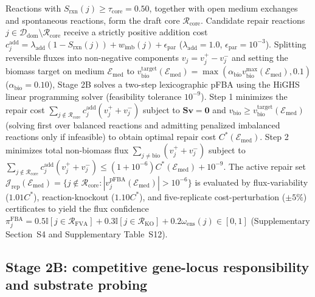 \documentclass[10pt,twocolumn]{article}
\begin{document}
Reactions with $S_{\text{rxn}}(j) \ge \tau_{\text{core}} = 0.50$, together with open medium exchanges and spontaneous reactions, form the draft core $\mathcal{R}_{\text{core}}$. Candidate repair reactions $j \in \mathcal{D}_{\text{dom}} \setminus \mathcal{R}_{\text{core}}$ receive a strictly positive addition cost $c_j^{\text{add}} = \lambda_{\text{add}}(1 - S_{\text{rxn}}(j)) + w_{\text{imb}}(j) + \epsilon_{\text{par}}$ ($\lambda_{\text{add}} = 1.0$, $\epsilon_{\text{par}} = 10^{-3}$). Splitting reversible fluxes into non-negative components $v_j = v_j^+ - v_j^-$ and setting the biomass target on medium $\mathcal{E}_{\text{med}}$ to $v_{\text{bio}}^{\text{target}}(\mathcal{E}_{\text{med}}) = \max(\alpha_{\text{bio}} v_{\text{bio}}^{\max}(\mathcal{E}_{\text{med}}), 0.1)$ ($\alpha_{\text{bio}} = 0.10$), Stage 2B solves a two-step lexicographic pFBA \citep{lewis2010omic} using the HiGHS linear programming solver (feasibility tolerance $10^{-9}$). Step 1 minimizes the repair cost $\sum_{j \notin \mathcal{R}_{\text{core}}} c_j^{\text{add}}(v_j^+ + v_j^-)$ subject to $\mathbf{S}\mathbf{v} = \mathbf{0}$ and $v_{\text{bio}} \ge v_{\text{bio}}^{\text{target}}(\mathcal{E}_{\text{med}})$ (solving first over balanced reactions and admitting penalized imbalanced reactions only if infeasible) to obtain optimal repair cost $C^*(\mathcal{E}_{\text{med}})$. Step 2 minimizes total non-biomass flux $\sum_{j \ne \text{bio}} (v_j^+ + v_j^-)$ subject to $\sum_{j \notin \mathcal{R}_{\text{core}}} c_j^{\text{add}}(v_j^+ + v_j^-) \le (1 + 10^{-6})C^*(\mathcal{E}_{\text{med}}) + 10^{-9}$. The active repair set $\mathcal{J}_{\text{rep}}(\mathcal{E}_{\text{med}}) = \{j \notin \mathcal{R}_{\text{core}} : |v_j^{\text{pFBA}}(\mathcal{E}_{\text{med}})| > 10^{-6}\}$ is evaluated by flux-variability ($1.01 C^*$), reaction-knockout ($1.10 C^*$), and five-replicate cost-perturbation ($\pm 5\%$) certificates to yield the flux confidence $\pi_j^{\text{FBA}} = 0.5\mathbb{I}[j \in \mathcal{R}_{\text{FVA}}] + 0.3\mathbb{I}[j \in \mathcal{R}_{\text{KO}}] + 0.2\omega_{\text{ens}}(j) \in [0, 1]$ (Supplementary Section~S4 and Supplementary Table~S12).

\subsection{Stage 2B: competitive gene-locus responsibility and substrate probing}
\label{sec:methods_slr}
\end{document}
